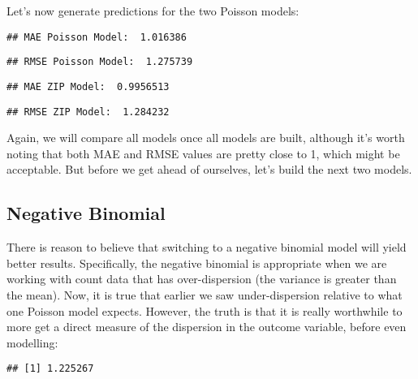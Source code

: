 \documentclass[
]{article}
\newenvironment{Shaded}{\begin{snugshade}}{\end{snugshade}}
\newcommand{\FunctionTok}[1]{\textcolor[rgb]{0.13,0.29,0.53}{\textbf{#1}}}
\newcommand{\NormalTok}[1]{#1}
\newcommand{\OtherTok}[1]{\textcolor[rgb]{0.56,0.35,0.01}{#1}}
\newcommand{\SpecialCharTok}[1]{\textcolor[rgb]{0.81,0.36,0.00}{\textbf{#1}}}
\begin{document}
Let's now generate predictions for the two Poisson models:

\begin{verbatim}
## MAE Poisson Model:  1.016386
\end{verbatim}

\begin{verbatim}
## RMSE Poisson Model:  1.275739
\end{verbatim}

\begin{verbatim}
## MAE ZIP Model:  0.9956513
\end{verbatim}

\begin{verbatim}
## RMSE ZIP Model:  1.284232
\end{verbatim}

Again, we will compare all models once all models are built, although
it's worth noting that both MAE and RMSE values are pretty close to 1,
which might be acceptable. But before we get ahead of ourselves, let's
build the next two models.

\subsection{Negative Binomial}\label{negative-binomial}

There is reason to believe that switching to a negative binomial model
will yield better results. Specifically, the negative binomial is
appropriate when we are working with count data that has over-dispersion
(the variance is greater than the mean). Now, it is true that earlier we
saw under-dispersion relative to what one Poisson model expects.
However, the truth is that it is really worthwhile to more get a direct
measure of the dispersion in the outcome variable, before even
modelling:

\begin{Shaded}
\end{Shaded}

\begin{verbatim}
## [1] 1.225267
\end{verbatim}
\end{document}

